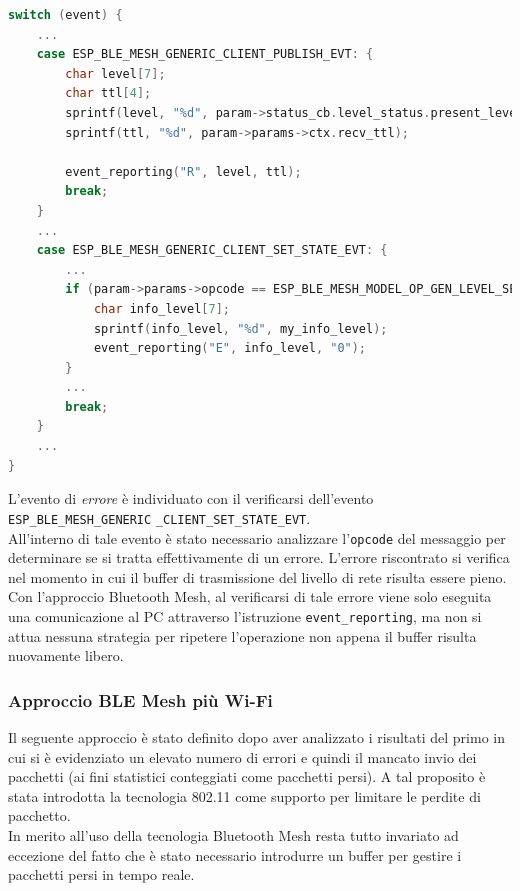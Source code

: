 \begin{lstlisting}[language=C, caption= evento di ricezione ed errore in fase d'invio]
switch (event) {
    ...
    case ESP_BLE_MESH_GENERIC_CLIENT_PUBLISH_EVT: {
        char level[7];
        char ttl[4];
        sprintf(level, "%d", param->status_cb.level_status.present_level);
        sprintf(ttl, "%d", param->params->ctx.recv_ttl);
        
        event_reporting("R", level, ttl);
        break;
    }
    ...
    case ESP_BLE_MESH_GENERIC_CLIENT_SET_STATE_EVT: {
        ...
        if (param->params->opcode == ESP_BLE_MESH_MODEL_OP_GEN_LEVEL_SET_UNACK) {
            char info_level[7];
            sprintf(info_level, "%d", my_info_level);
            event_reporting("E", info_level, "0");
        }
        ...
        break;
    }
    ...
}
\end{lstlisting}

\noindent L'evento di \textit{errore} è individuato con il verificarsi dell'evento \texttt{ESP\_BLE\_MESH\_GENERIC} \texttt{\_CLIENT\_SET\_STATE\_EVT}.\\ All'interno di tale evento è stato necessario analizzare l'\texttt{opcode} del messaggio per determinare se si tratta effettivamente di un errore. L'errore riscontrato si verifica nel momento in cui il buffer di trasmissione del livello di rete risulta essere pieno.\\
Con l'approccio Bluetooth Mesh, al verificarsi di tale errore viene solo eseguita una comunicazione al PC attraverso l'istruzione \texttt{event\_reporting}, ma non si attua nessuna strategia per ripetere l'operazione non appena il buffer risulta nuovamente libero.

\subsubsection{Approccio BLE Mesh più Wi-Fi}
\label{subsub:BLE_WiFi}
Il seguente approccio è stato definito dopo aver analizzato i risultati del primo in cui si è evidenziato un elevato numero di errori e quindi il mancato invio dei pacchetti (ai fini statistici conteggiati come pacchetti persi). A tal proposito è stata introdotta la tecnologia 802.11 come supporto per limitare le perdite di pacchetto.\\
In merito all'uso della tecnologia Bluetooth Mesh resta tutto invariato ad eccezione del fatto che è stato necessario introdurre un buffer per gestire i pacchetti persi in tempo reale.\\

